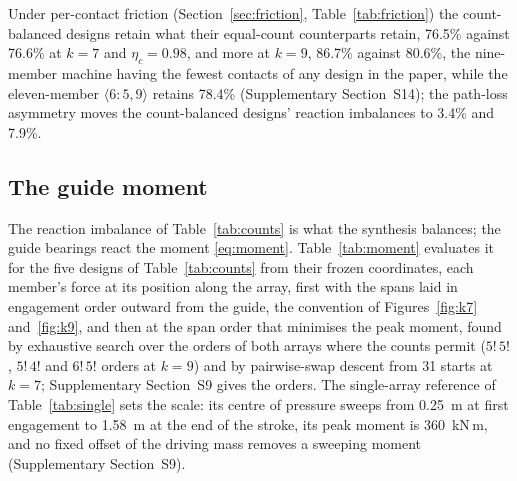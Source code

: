 \documentclass[preprint,12pt,number]{elsarticle}
\newcommand{\cfg}[2]{\langle #1,#2\rangle}
\begin{document}
Under per-contact friction (Section~\ref{sec:friction}, Table~\ref{tab:friction}) the count-balanced designs retain what their equal-count counterparts retain, 76.5\% against 76.6\% at $k=7$ and $\eta_c = 0.98$, and more at $k=9$, 86.7\% against 80.6\%, the nine-member machine having the fewest contacts of any design in the paper, while the eleven-member $\cfg{6{:}5}{9}$ retains 78.4\% (Supplementary Section~S14); the path-loss asymmetry moves the count-balanced designs' reaction imbalances to 3.4\% and 7.9\%.

\subsection{The guide moment}
\label{sec:moment}

The reaction imbalance of Table~\ref{tab:counts} is what the synthesis balances; the guide bearings react the moment \eqref{eq:moment}. Table~\ref{tab:moment} evaluates it for the five designs of Table~\ref{tab:counts} from their frozen coordinates, each member's force at its position along the array, first with the spans laid in engagement order outward from the guide, the convention of Figures~\ref{fig:k7} and~\ref{fig:k9}, and then at the span order that minimises the peak moment, found by exhaustive search over the orders of both arrays where the counts permit ($5!\,5!$, $5!\,4!$ and $6!\,5!$ orders at $k=9$) and by pairwise-swap descent from 31 starts at $k=7$; Supplementary Section~S9 gives the orders. The single-array reference of Table~\ref{tab:single} sets the scale: its centre of pressure sweeps from 0.25~m at first engagement to 1.58~m at the end of the stroke, its peak moment is 360~kN\,m, and no fixed offset of the driving mass removes a sweeping moment (Supplementary Section~S9).
\end{document}
